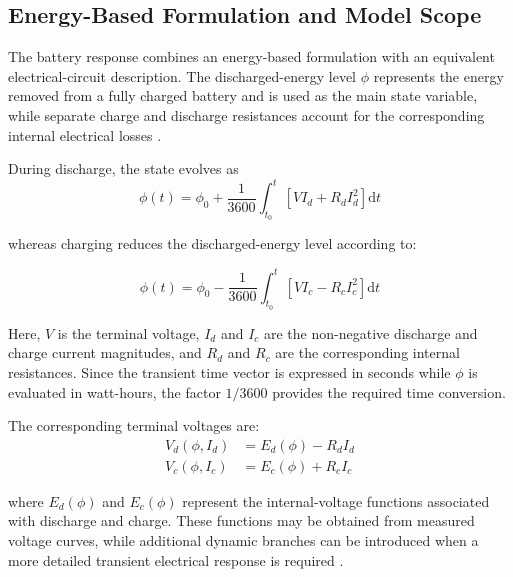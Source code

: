 \subsection{Energy-Based Formulation and Model Scope}
\label{subsec:battery_theoretical_basis}

The battery response combines an energy-based formulation with an equivalent
electrical-circuit description. The discharged-energy level
\(\phi\) represents the energy removed from a fully charged battery and is
used as the main state variable, while separate charge and discharge
resistances account for the corresponding internal electrical losses
\cite{porras2018battery}.

During discharge, the state evolves as
\begin{equation}
    \phi(t)
    =
    \phi_0
    +
    \frac{1}{3600}
    \int_{t_0}^{t}
    \left[
        V I_d + R_d I_d^2
    \right]
    \mathrm{d}t
    \label{eq:battery_discharge_energy_ch8}
\end{equation}

whereas charging reduces the discharged-energy level according to:

\begin{equation}
    \phi(t)
    =
    \phi_0
    -
    \frac{1}{3600}
    \int_{t_0}^{t}
    \left[
        V I_c - R_c I_c^2
    \right]
    \mathrm{d}t
    \label{eq:battery_charge_energy_ch8}
\end{equation}

Here, $V$ is the terminal voltage, $I_d$ and $I_c$ are the non-negative
discharge and charge current magnitudes, and $R_d$ and $R_c$ are the
corresponding internal resistances. Since the transient time vector is
expressed in seconds while $\phi$ is evaluated in watt-hours, the factor
\(1/3600\) provides the required time conversion.

The corresponding terminal voltages are:
\begin{align}
    V_d(\phi,I_d)
    &=
    E_d(\phi)-R_d I_d
    \label{eq:battery_discharge_voltage_ch8}
    \\
    V_c(\phi,I_c)
    &=
    E_c(\phi)+R_c I_c
    \label{eq:battery_charge_voltage_ch8}
\end{align}

where $E_d(\phi)$ and $E_c(\phi)$ represent the internal-voltage functions
associated with discharge and charge. These functions may be obtained from
measured voltage curves, while additional dynamic branches can be introduced
when a more detailed transient electrical response is required
\cite{porras2018battery}.

